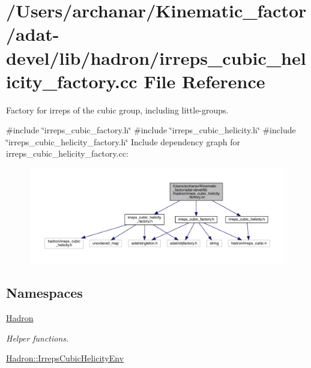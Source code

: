 \hypertarget{adat-devel_2lib_2hadron_2irreps__cubic__helicity__factory_8cc}{}\section{/\+Users/archanar/\+Kinematic\+\_\+factor/adat-\/devel/lib/hadron/irreps\+\_\+cubic\+\_\+helicity\+\_\+factory.cc File Reference}
\label{adat-devel_2lib_2hadron_2irreps__cubic__helicity__factory_8cc}


Factory for irreps of the cubic group, including little-\/groups.  


{\ttfamily \#include \char`\"{}irreps\+\_\+cubic\+\_\+factory.\+h\char`\"{}}\newline
{\ttfamily \#include \char`\"{}irreps\+\_\+cubic\+\_\+helicity.\+h\char`\"{}}\newline
{\ttfamily \#include \char`\"{}irreps\+\_\+cubic\+\_\+helicity\+\_\+factory.\+h\char`\"{}}\newline
Include dependency graph for irreps\+\_\+cubic\+\_\+helicity\+\_\+factory.\+cc\+:
\nopagebreak
\begin{figure}[H]
\begin{center}
\leavevmode
\includegraphics[width=350pt]{d4/dbe/adat-devel_2lib_2hadron_2irreps__cubic__helicity__factory_8cc__incl}
\end{center}
\end{figure}
\subsection*{Namespaces}
\begin{DoxyCompactItemize}
\item 
 \mbox{\hyperlink{namespaceHadron}{Hadron}}
\begin{DoxyCompactList}\small\item\em Helper functions. \end{DoxyCompactList}\item 
 \mbox{\hyperlink{namespaceHadron_1_1IrrepsCubicHelicityEnv}{Hadron\+::\+Irreps\+Cubic\+Helicity\+Env}}
\end{DoxyCompactItemize}
